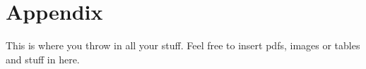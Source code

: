 \documentclass[../Main/main.tex]{subfiles}
\begin{document}
\chapter{Appendix}

This is where you throw in all your stuff. Feel free to insert pdfs, images or tables and stuff in here.
\end{document}
